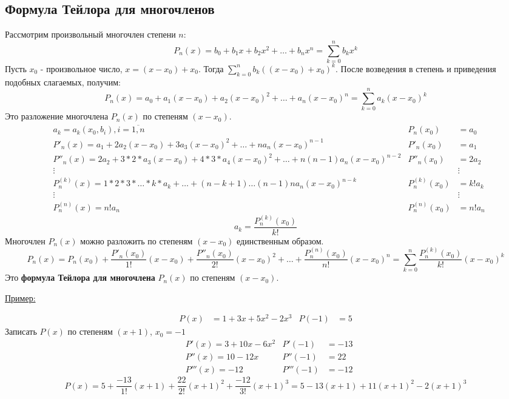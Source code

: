 \documentclass[12pt]{article}
\begin{document}
    \subsection{Формула Тейлора для многочленов}\noindent
    Рассмотрим произвольный многочлен степени $n$:
    \[ P_n(x) = b_0 + b_1x + b_2x^2 + \dots + b_nx^n = \sum_{k=0}^{n}b_kx^k \]
    Пусть $x_0$ - произвольное число, $x = (x - x_0) + x_0$.
    Тогда $\sum_{k=0}^{n}b_k((x-x_0)+x_0)^k$. После возведения в степень и приведения подобных слагаемых, получим:
    \[ P_n(x) = a_0 + a_1(x- x_0) + a_2(x-x_0)^2 + \dots + a_n(x - x_0)^n = \sum_{k=0}^{n}a_k(x-x_0)^k \]
    Это разложение многочлена $P_n(x)$ по степеням $(x-x_0)$.
    \begin{align*}
        &a_k = a_k (x_0, b_i), i = \overline{1,n} & P_n(x_0) &= a_0\\
        &P'_n(x) = a_1 + 2a_2(x-x_0) + 3a_3(x-x_0)^2 + \dots + na_n(x-x_0)^{n-1} & P'_n(x_0) &= a_1\\
        &P''_n(x) = 2a_2 + 3*2*a_3(x-x_0) + 4*3*a_4(x-x_0)^2 + \dots + n(n-1)a_n(x-x_0)^{n-2} & P''_n(x_0) &= 2a_2\\
        &\vdots & &\vdots\\
        &P^{(k)}_n(x) = 1*2*3*\dots*k*a_k + \dots + (n-k+1) \dots (n-1)na_n(x-x_0)^{n-k} & P^{(k)}_n(x_0) &= k!a_k\\
        &\vdots & &\vdots\\
        &P^{(n)}_n(x) = n!a_n & P^{(n)}_n(x_0) &= n!a_n
    \end{align*}
    \[ \boxed{ a_k = \frac{P^{(k)}_n(x_0)}{k!} } \]
    Многочлен $P_n(x)$ можно разложить по степеням $(x - x_0)$ единственным образом.
    \[ P_n(x) = P_n(x_0) + \frac{P'_n(x_0)}{1!}(x-x_0) + \frac{P''_n(x_0)}{2!}(x-x_0)^2 + \dots + \frac{P^{(n)}_n(x_0)}{n!}(x-x_0)^n = \boxed{ \sum_{k=0}^{n}\frac{P^{(k)}_n(x_0)}{k!}(x-x_0)^k } \]
    Это \textbf{формула Тейлора для многочлена} $P_n(x)$ по степеням $(x-x_0)$.\par\noindent
    \underline{Пример:}
    \begin{adjustwidth}{1.5em}{1.5em}
        \begin{align*}
            P(x) &= 1 + 3x + 5x^2 - 2x^3 & P(-1) &= 5
        \end{align*}
        Записать $P(x)$ по степеням $(x + 1)$, $x_0 = -1$
        \begin{align*}
            &P'(x) = 3 + 10x - 6x^2 & P'(-1) &= -13\\
            &P''(x) = 10 - 12x & P''(-1) &= 22\\
            &P'''(x) = -12 & P'''(-1) &= -12
        \end{align*}
        \[ P(x) = 5 + \frac{-13}{1!}(x+1) + \frac{22}{2!}(x+1)^2 + \frac{-12}{3!}(x+1)^3 = 5 - 13(x+1) + 11(x+1)^2 - 2(x+1)^3 \]
    \end{adjustwidth}
\end{document}
